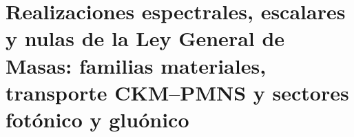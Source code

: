 \chapter{Realizaciones espectrales, escalares y nulas de la Ley General de Masas: familias materiales, transporte CKM--PMNS y sectores fotónico y gluónico}
\label{chap:md-realizaciones-masicas-definitivo}
\begingroup
\let\HMTOwnerSection\section
\let\HMTOwnerSubsection\subsection
\let\HMTOwnerSubsubsection\subsubsection
\let\HMTOwnerParagraph\paragraph
\let\chapter\HMTOwnerSection
\let\section\HMTOwnerSubsection
\let\subsection\HMTOwnerSubsubsection
\let\subsubsection\HMTOwnerParagraph

\endgroup
\begingroup
\renewcommand{\chapter}[2][]{}%

\endgroup


